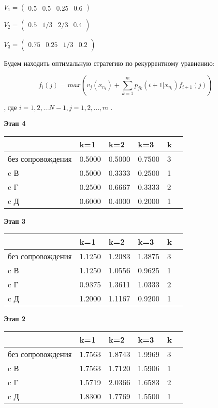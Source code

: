 \documentclass[14pt,a4paper,report]{report}
\begin{document}
$ V_1=
\begin{pmatrix} 
0.5  & 0.5 & 0.25 & 0.6
\end{pmatrix} $

$ V_2=
\begin{pmatrix} 
0.5  & 1/3 & 2/3 & 0.4
\end{pmatrix} $

$ V_3=
\begin{pmatrix} 
0.75  & 0.25 & 1/3 & 0.2
\end{pmatrix} $

Будем находить оптимальную стратегию по рекуррентному уравнению:

$$ f_i(j)= max(v_j(x_n_i)+\sum_{k=1}^m p_{jk} (i+1|x_n_i)f_{i+1}(j))    $$

, где   $i = 1,2,...N-1, j = 1,2,...,m$  .

\clearpage

\textbf{Этап 4}
\begin{table}[h!]
\begin{tabular}{|l|l|l|l|l|l|}
\hline
	 &	 k=1  &  k=2 &   k=3   & k \\ \hline
	без сопровождения   &  0.5000 &   0.5000  &  0.7500 & 3 \\
    c В &      0.5000 &   0.3333  &  0.2500 & 1 \\
    c Г &      0.2500 &   0.6667  &  0.3333 & 2 \\
    c Д&       0.6000 &   0.4000 &    0.2000 & 1 \\ \hline
\end{tabular}
\end{table}

\textbf{Этап 3}
\begin{table}[h!]
\begin{tabular}{|l|l|l|l|l|l|}
\hline
	 &	 k=1  &  k=2 &   k=3  &  k \\ \hline

       без сопровождения  &  1.1250  &  1.2083  &  1.3875 & 3 \\
    c В   &  1.1250  &  1.0556  &  0.9625 & 1 \\
       c Г   &  0.9375  &  1.3611  &  1.0333 & 2 \\
       c Д  &  1.2000  &  1.1167 &    0.9200 & 1 \\ \hline
		 \end{tabular}
\end{table}



\textbf{Этап 2}
\begin{table}[h!]
\begin{tabular}{|l|l|l|l|l|l|}
\hline
	 &	 k=1  &  k=2 &   k=3   & k \\ \hline

		 без сопровождения  &    1.7563 &    1.8743    & 1.9969 & 3\\
    c В     & 1.7563    & 1.7120    & 1.5906 & 1\\
     c Г & 1.5719    & 2.0366    & 1.6583 & 2\\
c Д   & 1.8300    & 1.7769    & 1.5500 & 1\\ \hline
		 \end{tabular}
\end{table}
\end{document}
